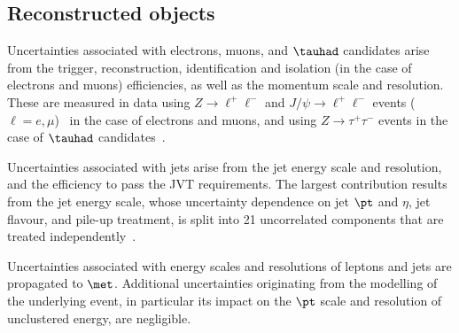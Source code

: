 \subsection{Reconstructed objects}
\label{sec:syst_objects}


Uncertainties associated with electrons, muons, and $\tauhad$ candidates arise from the trigger, reconstruction,  
identification and isolation (in the case of electrons and muons) efficiencies, as well as the momentum scale and resolution. 
These are measured in data using $Z\to \ell^+\ell^-$ and $J/\psi\to \ell^+\ell^-$ events ($\ell =e, \mu$)~\cite{ATLAS-CONF-2016-024,Aad:2016jkr} 
in the case of electrons and muons, and using $Z\to \tau^+\tau^-$ events in the case of $\tauhad$ candidates~\cite{ATLAS-CONF-2017-029}.

Uncertainties associated with jets arise from the jet energy scale
and resolution, and the efficiency to pass the JVT requirements. 
The largest contribution results from the jet energy scale, whose uncertainty dependence on jet $\pt$ and $\eta$, jet flavour, and pile-up treatment, 
is split into 21 uncorrelated components that are treated independently~\cite{Aaboud:2017jcu}.  

Uncertainties associated with energy scales and resolutions of leptons and jets 
are propagated to $\met$. Additional uncertainties originating from the modelling 
of the underlying event, in particular its impact on the $\pt$ scale and resolution 
of unclustered energy, are negligible.

